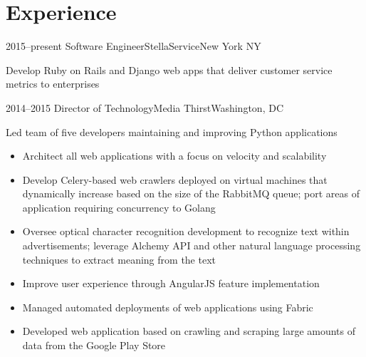 \documentclass[10pt,a4paper,roman]{moderncv}        %
\begin{document}
\makecvtitle
\vspace{-1.25cm}

\section{Experience}

\cventry
{2015--present}
{Software Engineer}{StellaService}{New York NY}{}
{Develop Ruby on Rails and Django web apps that deliver customer service metrics to enterprises
\begin{itemize}
\end{itemize}}

\cventry
{2014--2015}
{Director of Technology}{Media Thirst}{Washington, DC}{}
{Led team of five developers maintaining and improving Python applications
\begin{itemize}
\item Architect all web applications with a focus on velocity and scalability
\item Develop Celery-based web crawlers deployed on virtual machines that dynamically increase based on the size of the RabbitMQ queue; port areas of application requiring concurrency to Golang
\item Oversee optical character recognition development to recognize text within advertisements; leverage Alchemy API and other natural language processing techniques to extract meaning from the text
\item Improve user experience through AngularJS feature implementation
\item Managed automated deployments of web applications using Fabric
\item Developed web application based on crawling and scraping large amounts of data from the Google Play Store
\end{itemize}}
\vspace{.15cm}

\vspace{.15cm}
\end{document}
